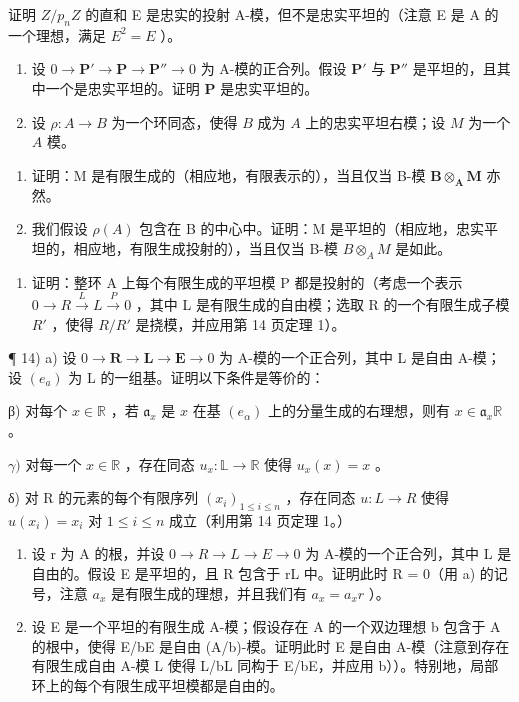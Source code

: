 证明 \(Z/p_{n}Z\) 的直和 E 是忠实的投射 A-模，但不是忠实平坦的（注意 E 是 A 的一个理想，满足 \(E^{2}=E\) ）。

\begin{enumerate}
\def\labelenumi{\arabic{enumi})}
\setcounter{enumi}{10}
\item
  设 \(0 \to \mathbf{P}' \to \mathbf{P} \to \mathbf{P}'' \to 0\) 为 A-模的正合列。假设 \(\mathbf{P}'\) 与 \(\mathbf{P}''\) 是平坦的，且其中一个是忠实平坦的。证明 \(\mathbf{P}\) 是忠实平坦的。
\item
  设 \(\rho: A \to B\) 为一个环同态，使得 \(B\) 成为 \(A\) 上的忠实平坦右模；设 \(M\) 为一个 \(A\) 模。
\end{enumerate}

\begin{enumerate}
\def\labelenumi{\alph{enumi})}
\item
  证明：M 是有限生成的（相应地，有限表示的），当且仅当 B-模 \(\mathbf{B} \otimes_{\mathbf{A}} \mathbf{M}\) 亦然。
\item
  我们假设 \(\rho(A)\) 包含在 B 的中心中。证明：M 是平坦的（相应地，忠实平坦的，相应地，有限生成投射的），当且仅当 B-模 \(B \otimes_{A} M\) 是如此。
\end{enumerate}

\begin{enumerate}
\def\labelenumi{\arabic{enumi})}
\setcounter{enumi}{12}
\tightlist
\item
  证明：整环 A 上每个有限生成的平坦模 P 都是投射的（考虑一个表示 \(0 \rightarrow R \xrightarrow{L} L \xrightarrow{P} 0\) ，其中 L 是有限生成的自由模；选取 R 的一个有限生成子模 \(R'\) ，使得 \(R/R'\) 是挠模，并应用第 14 页定理 1）。
\end{enumerate}

¶ 14) a) 设 \(0 \to \mathbf{R} \to \mathbf{L} \to \mathbf{E} \to 0\) 为 A-模的一个正合列，其中 L 是自由 A-模；设 \((e_{a})\) 为 L 的一组基。证明以下条件是等价的：

β) 对每个 \(x \in \mathbb{R}\) ，若 \(\mathfrak{a}_{x}\) 是 \(x\) 在基 \((e_{\alpha})\) 上的分量生成的右理想，则有 \(x \in \mathfrak{a}_{x} \mathbb{R}\) 。

\(\gamma)\) 对每一个 \(x \in \mathbb{R}\) ，存在同态 \(u_x: \mathbb{L} \to \mathbb{R}\) 使得 \(u_x(x) = x\) 。

δ) 对 R 的元素的每个有限序列 \((x_{i})_{1\leqslant i\leqslant n}\) ，存在同态 \(u:L\to R\) 使得 \(u(x_{i})=x_{i}\) 对 \(1\leqslant i\leqslant n\) 成立（利用第 14 页定理 1。）

\begin{enumerate}
\def\labelenumi{\alph{enumi})}
\setcounter{enumi}{1}
\item
  设 r 为 A 的根，并设 \(0 \rightarrow R \rightarrow L \rightarrow E \rightarrow 0\) 为 A-模的一个正合列，其中 L 是自由的。假设 E 是平坦的，且 R 包含于 rL 中。证明此时 R = 0（用 a) 的记号，注意 \(a_{x}\) 是有限生成的理想，并且我们有 \(a_{x} = a_{x} r\) ）。
\item
  设 E 是一个平坦的有限生成 A-模；假设存在 A 的一个双边理想 b 包含于 A 的根中，使得 E/bE 是自由 (A/b)-模。证明此时 E 是自由 A-模（注意到存在有限生成自由 A-模 L 使得 L/bL 同构于 E/bE，并应用 b））。特别地，局部环上的每个有限生成平坦模都是自由的。
\end{enumerate}

